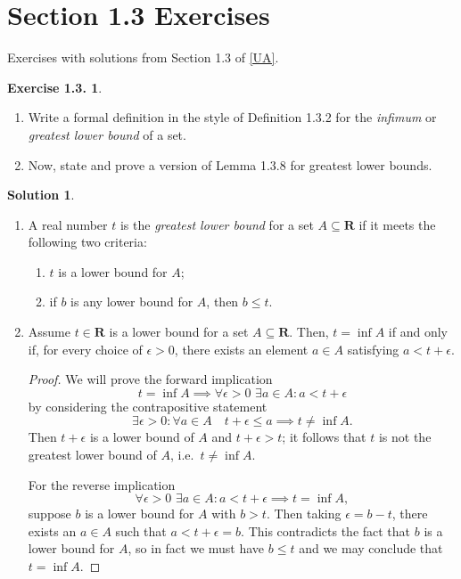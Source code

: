 \documentclass[12pt]{article}
\theoremstyle{definition}
\theoremstyle{exercise}
\newtheorem{exercise}{Exercise 1.3.}
\theoremstyle{solution}
\newtheorem*{solution}{Solution}
\newcommand{\R}{\mathbf{R}}
\begin{document}
\section{Section 1.3 Exercises}

Exercises with solutions from Section 1.3 of \hyperlink{ua}{[UA]}.

\begin{exercise}
\label{ex:1}
    \begin{enumerate}
        \item Write a formal definition in the style of Definition 1.3.2 for the \textit{infimum} or \textit{greatest lower bound} of a set.

        \item Now, state and prove a version of Lemma 1.3.8 for greatest lower bounds.
    \end{enumerate}
\end{exercise}

\begin{solution}
    \begin{enumerate}
        \item A real number \( t \) is the \textit{greatest lower bound} for a set \( A \subseteq \R \) if it meets the following two criteria:
        \begin{enumerate}[label = (\roman*)]
            \item \( t \) is a lower bound for \( A \);

            \item if \( b \) is any lower bound for \( A \), then \( b \leq t \).
        \end{enumerate}

        \item Assume \( t \in \R \) is a lower bound for a set \( A \subseteq \R \). Then, \( t = \inf A \) if and only if, for every choice of \( \epsilon > 0 \), there exists an element \( a \in A \) satisfying \( a < t + \epsilon \).
        \begin{proof}
            We will prove the forward implication
            \[
                t = \inf A \implies \forall \epsilon > 0 \,\, \exists a \in A : a < t + \epsilon
            \]
            by considering the contrapositive statement
            \[
                \exists \epsilon > 0 : \forall a \in A \quad t + \epsilon \leq a \implies t \neq \inf A.
            \]
            Then \( t + \epsilon \) is a lower bound of \( A \) and \( t + \epsilon > t \); it follows that \( t \) is not the greatest lower bound of \( A \), i.e.\ \( t \neq \inf A \).

            For the reverse implication
            \[
                \forall \epsilon > 0 \,\, \exists a \in A : a < t + \epsilon \implies t = \inf A,
            \]
            suppose \( b \) is a lower bound for \( A \) with \( b > t \). Then taking \( \epsilon = b - t \), there exists an \( a \in A \) such that \( a < t + \epsilon = b \). This contradicts the fact that \( b \) is a lower bound for \( A \), so in fact we must have \( b \leq t \) and we may conclude that \( t = \inf A \).
        \end{proof}
    \end{enumerate}
\end{solution}
\end{document}
